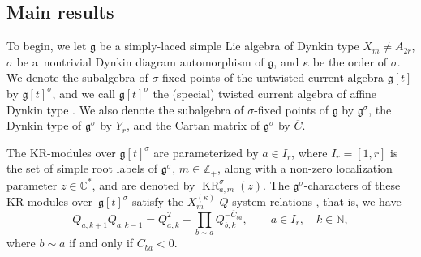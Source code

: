 \documentclass[pdftex]{sigma}
\numberwithin{equation}{section}
\DeclareMathOperator{\KR}{KR}
\DeclareMathOperator{\ch}{ch}
\DeclareMathOperator{\res}{res}
\begin{document}
\subsection{Main results}\label{Section 1.2}

To begin, we let $\mathfrak{g}$ be a simply-laced simple Lie algebra of Dynkin type $X_m\neq A_{2r}$, $\sigma$ be a~nontrivial Dynkin diagram automorphism of $\mathfrak{g}$, and $\kappa$ be the order of $\sigma$. We denote the subalgebra of $\sigma$-fixed points of the untwisted current algebra $\mathfrak{g}[t]$ by $\mathfrak{g}[t]^{\sigma}$, and we call $\mathfrak{g}[t]^{\sigma}$ the (special) \cite[Section 1.5]{KV16} twisted current algebra of affine Dynkin type . We also denote the subalgebra of $\sigma$-fixed points of $\mathfrak{g}$ by $\mathfrak{g}^{\sigma}$, the Dynkin type of $\mathfrak{g}^{\sigma}$ by $Y_r$, and the Cartan matrix of $\mathfrak{g}^{\sigma}$ by $\overline{C}$.

The KR-modules over $\mathfrak{g}[t]^{\sigma}$ are parameterized by $a\in I_r$, where $I_r=[1,r]$ is the set of simple root labels of $\mathfrak{g}^{\sigma}$, $m\in\mathbb{Z}_+$, along with a non-zero localization parameter $z\in\mathbb{C}^*$, and are denoted by $\KR_{a,m}^{\sigma}(z)$. The $\mathfrak{g}^{\sigma}$-characters \smash{$Q_{a,k}=\ch\res_{\mathfrak{g}^{\sigma}}^{\mathfrak{g}[t]^{\sigma}}\KR_{a,k}^{\sigma}(z)$} of these KR-modules over~$\mathfrak{g}[t]^{\sigma}$ satisfy the $X_m^{(\kappa)}$ $Q$-system relations \cite{KS95}, that is, we have
\begin{equation}\label{eq:1.1}
Q_{a,k+1}Q_{a,k-1}=Q_{a,k}^2-\prod_{b\sim a}Q_{b,k}^{-\overline{C}_{ba}},\qquad a\in I_r,\quad k\in\mathbb{N},
\end{equation}
where $b\sim a$ if and only if $\overline{C}_{ba}<0$.
\end{document}
